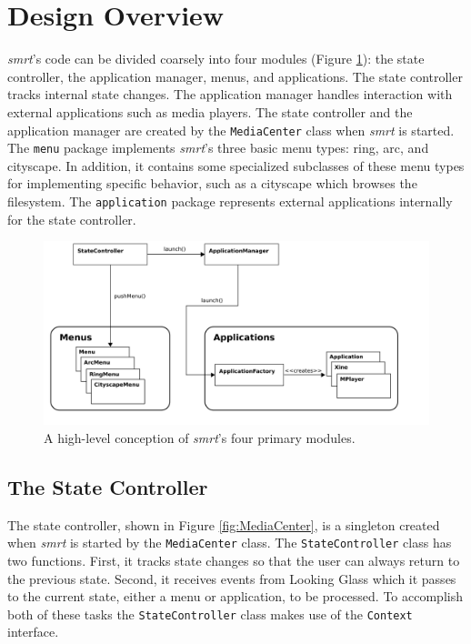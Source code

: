 \documentclass[letterpaper, titlepage, 11pt]{article}
\begin{document}
\section{Design Overview}
\label{DesignOverview}
\textit{smrt}'s code can be divided coarsely into four modules (Figure
\ref{fig:modules}): the state controller, the application manager, menus, and
applications. The state controller tracks internal state changes. The
application manager handles interaction with external applications such as media
players. The state controller and the application manager are created by the
\texttt{MediaCenter} class when \textit{smrt} is started. The \texttt{menu}
package implements \textit{smrt}'s three basic menu types: ring, arc, and
cityscape. In addition, it contains some specialized subclasses of these menu
types for implementing specific behavior, such as a cityscape which browses the
filesystem.  The \texttt{application} package represents external applications
internally for the state controller.

\begin{figure}[htb]
\centering
\includegraphics[height=.9\linewidth,angle=-90]{figures/modules}
\caption{A high-level conception of \textit{smrt}'s four primary
modules.\label{fig:modules}}
\end{figure}

\subsection{The State Controller}
The state controller, shown in Figure \ref{fig:MediaCenter}, is a singleton
created when \textit{smrt} is started by the \texttt{MediaCenter} class.  The
\texttt{StateController} class has two functions. First, it tracks state changes
so that the user can always return to the previous state. Second, it receives
events from Looking Glass which it passes to the current state, either a menu or
application, to be processed.  To accomplish both of these tasks the
\texttt{StateController} class makes use of the \texttt{Context} interface.
\end{document}
